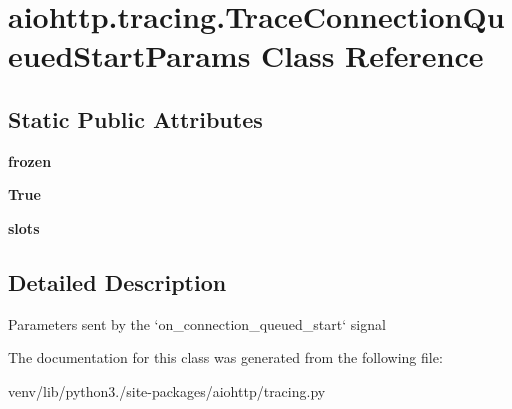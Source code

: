 \hypertarget{classaiohttp_1_1tracing_1_1_trace_connection_queued_start_params}{}\section{aiohttp.\+tracing.\+Trace\+Connection\+Queued\+Start\+Params Class Reference}
\label{classaiohttp_1_1tracing_1_1_trace_connection_queued_start_params}
\subsection*{Static Public Attributes}
\begin{DoxyCompactItemize}
\item 
\mbox{\label{classaiohttp_1_1tracing_1_1_trace_connection_queued_start_params_af020731554ac2fa9383ded6dfd45ae85}} 
{\bfseries frozen}
\item 
\mbox{\label{classaiohttp_1_1tracing_1_1_trace_connection_queued_start_params_aaa8932a7d578b84995888667810c4118}} 
{\bfseries True}
\item 
\mbox{\label{classaiohttp_1_1tracing_1_1_trace_connection_queued_start_params_a1a952987b857c8ed9caa9b2c066f5a5a}} 
{\bfseries slots}
\end{DoxyCompactItemize}


\subsection{Detailed Description}
\begin{DoxyVerb}Parameters sent by the `on_connection_queued_start` signal\end{DoxyVerb}
 

The documentation for this class was generated from the following file\+:\begin{DoxyCompactItemize}
\item 
venv/lib/python3./site-\/packages/aiohttp/tracing.\+py\end{DoxyCompactItemize}
